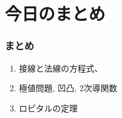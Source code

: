 \documentclass[dvipdfmx,cjk,10.2pt]{beamer}
\theoremstyle{definition}
\begin{document}









\section{今日のまとめ}
\begin{frame}
\frametitle{まとめ}   


\begin{enumerate}
\item 接線と法線の方程式、
\item 極値問題, 凹凸, 2次導関数
\item ロピタルの定理
\end{enumerate} 

\end{frame}
\end{document}
